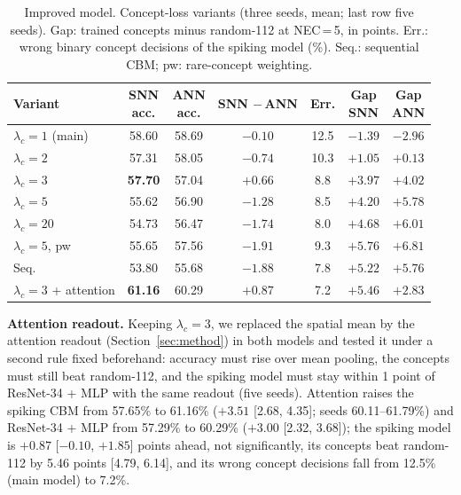 \documentclass[conference]{IEEEtran}
\begin{document}
\begin{table}[t]
\caption{Improved model. Concept-loss variants (three seeds, mean; last row five seeds). Gap: trained concepts minus random-112 at NEC\,=\,5, in points. Err.: wrong binary concept decisions of the spiking model (\%). Seq.: sequential CBM; pw: rare-concept weighting.}
\label{tab:lambda}
\centering
\footnotesize
\setlength{\tabcolsep}{3pt}
\begin{tabular}{@{}lcccccc@{}}
\toprule
Variant & \makecell{SNN\\acc.} & \makecell{ANN\\acc.} & \makecell{SNN\\$-$\,ANN} & Err. & \makecell{Gap\\SNN} & \makecell{Gap\\ANN} \\
\midrule
$\lambda_c=1$ (main) & 58.60 & 58.69 & $-0.10$ & 12.5 & $-1.39$ & $-2.96$ \\
$\lambda_c=2$ & 57.31 & 58.05 & $-0.74$ & 10.3 & $+1.05$ & $+0.13$ \\
$\lambda_c=3$ & \textbf{57.70} & 57.04 & $\mathbf{+0.66}$ & 8.8 & $\mathbf{+3.97}$ & $+4.02$ \\
$\lambda_c=5$ & 55.62 & 56.90 & $-1.28$ & 8.5 & $+4.20$ & $+5.78$ \\
$\lambda_c=20$ & 54.73 & 56.47 & $-1.74$ & 8.0 & $+4.68$ & $+6.01$ \\
$\lambda_c=5$, pw & 55.65 & 57.56 & $-1.91$ & 9.3 & $+5.76$ & $+6.81$ \\
Seq. & 53.80 & 55.68 & $-1.88$ & 7.8 & $+5.22$ & $+5.76$ \\
\midrule
$\lambda_c=3$ + attention & \textbf{61.16} & 60.29 & $\mathbf{+0.87}$ & 7.2 & $\mathbf{+5.46}$ & $+2.83$ \\
\bottomrule
\end{tabular}
\end{table}

\textbf{Attention readout.} Keeping $\lambda_c=3$, we replaced the spatial mean by the attention readout (Section~\ref{sec:method}) in both models and tested it under a second rule fixed beforehand: accuracy must rise over mean pooling, the concepts must still beat random-112, and the spiking model must stay within 1 point of ResNet-34 + MLP with the same readout (five seeds). Attention raises the spiking CBM from 57.65\% to 61.16\% ($+3.51$ [2.68, 4.35]; seeds 60.11--61.79\%) and ResNet-34 + MLP from 57.29\% to 60.29\% ($+3.00$ [2.32, 3.68]); the spiking model is $+0.87$ [$-0.10$, $+1.85$] points ahead, not significantly, its concepts beat random-112 by 5.46 points [4.79, 6.14], and its wrong concept decisions fall from 12.5\% (main model) to 7.2\%.
\end{document}
